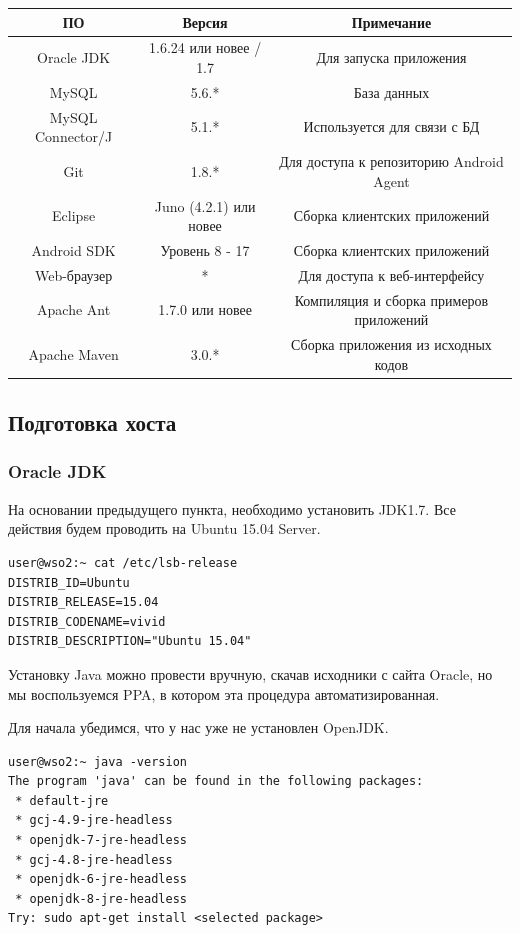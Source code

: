 \documentclass[a4paper, 12pt]{article}		%
\begin{document}
\begin{tabular}{|c|c|c|}
\hline 
ПО & Версия & Примечание \\ 
\hline 
{Oracle JDK} & 1.6.24 или новее / 1.7 & Для запуска приложения \\ 
\hline 
MySQL & 5.6.* & База данных \\ 
\hline 
MySQL Connector/J & 5.1.* & Используется для связи с БД \\ 
\hline 
Git & 1.8.* & Для доступа к репозиторию Android Agent \\ 
\hline 
Eclipse & Juno (4.2.1) или новее & Сборка клиентских приложений \\ 
\hline 
Android SDK & Уровень 8 - 17 & Сборка клиентских приложений \\ 
\hline 
Web-браузер & * & Для доступа к веб-интерфейсу \\ 
\hline 
Apache Ant & 1.7.0 или новее & Компиляция и сборка примеров приложений \\ 
\hline 
Apache Maven & 3.0.* & Сборка приложения из исходных кодов \\ 
\hline 
\end{tabular} 

\subsection{Подготовка хоста}

\subsubsection{Oracle JDK}

На основании предыдущего пункта, необходимо установить JDK1.7. Все действия будем проводить на Ubuntu 15.04 Server.

\begin{Verbatim}[frame=single]
user@wso2:~ cat /etc/lsb-release 
DISTRIB_ID=Ubuntu
DISTRIB_RELEASE=15.04
DISTRIB_CODENAME=vivid
DISTRIB_DESCRIPTION="Ubuntu 15.04"
\end{Verbatim}

Установку Java можно провести вручную, скачав исходники с сайта Oracle, но мы воспользуемся PPA, в котором эта процедура автоматизированная.

Для начала убедимся, что у нас уже не установлен OpenJDK.

\begin{Verbatim}[frame=single]
user@wso2:~ java -version
The program 'java' can be found in the following packages:
 * default-jre
 * gcj-4.9-jre-headless
 * openjdk-7-jre-headless
 * gcj-4.8-jre-headless
 * openjdk-6-jre-headless
 * openjdk-8-jre-headless
Try: sudo apt-get install <selected package>
\end{Verbatim}
\end{document}
